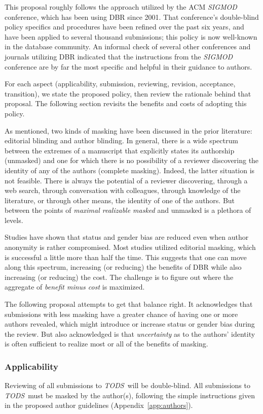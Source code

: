 \documentclass[acmtods,acmnow]{acmtrans2m}
\newcommand{\tods}{{\em TODS\/}}
\begin{document}
This proposal roughly follows the approach utilized by the ACM {\em SIGMOD}
conference, which has been using DBR since 2001. That conference's
double-blind policy specifics and procedures have been refined over the past
six years, and have been applied to several thousand submissions; this
policy is now well-known in the database community.  An
informal check of several other conferences and journals utilizing DBR
indicated that the instructions from the {\em SIGMOD} conference are by far
the most specific and helpful in their guidance to authors.

For each aspect (applicability, submission, reviewing, revision, acceptance,
transition), we state the proposed policy, then review the rationale behind
that proposal. The following section revisits the benefits and costs of
adopting this policy.

As mentioned, two kinds of masking have been discussed in the prior literature: editorial
blinding and author blinding. In general, there is a wide spectrum between
the extremes of a manuscript that explicitly states its authorship (unmasked)
and one for which there is no possibility of a reviewer discovering the
identity of any of the authors (complete masking). Indeed, the latter
situation is not feasible. There is always the potential of a reviewer
discovering, through a web search, through conversation with colleagues,
through knowledge of the literature, or through other means, the identity of
one of the authors. But between the points of {\em maximal realizable
masked} and unmasked is a plethora of levels.

Studies have shown that status and gender bias are reduced even when author anonymity is
rather compromised. Most studies utilized editorial masking, which is
successful a little more than half the time. This suggests that one can move
along this spectrum, increasing (or reducing) the benefits of DBR while also
increasing (or reducing)
the cost. The challenge is to figure out where the aggregate of {\em benefit
minus cost} is maximized.

The following proposal attempts to get that balance right. It acknowledges
that submissions with less masking have a greater chance of having one or
more authors revealed, which might introduce or increase status or gender bias during
the review. But also acknowledged is that {\em uncertainty} as to the
authors' identity is often sufficient to realize most or all of the benefits of
masking.

\subsubsection{Applicability}\label{sec:applicability}
Reviewing of all submissions to \tods\ will be double-blind.
All submissions to \tods\ must be masked by the author(s), following
the simple instructions given in the proposed author guidelines
(Appendix~\ref{app:authors}).
\end{document}
